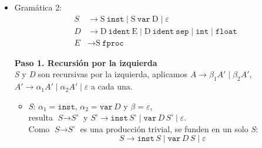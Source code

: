 \documentclass[12pt,letterpaper]{article}
\newcommand{\nt}[1]{\textit{#1}}
\newcommand{\tk}[1]{\texttt{#1}}
\newcommand{\tx}[1]{\text{#1}}
\newcommand{\First}[1]{\mathrm{FIRST}(#1)}
\newcommand{\Follow}[1]{\mathrm{FOLLOW}(#1)}
\newcommand{\eps}{\varepsilon}
\begin{document}
\begin{enumerate}[label=\arabic*.]
\begin{itemize}
    \nt{S} no tiene producción $\eps$, pero la producción 1 también aparece en \tk{fin} y \tk{\$} porque
    $\nt{T}\,\nt{R}\,\nt{V}\,\nt{S'}$ es anulable, por lo que se coloca además en $\Follow{\tx{S}}$.\\
   
    Ninguna celda tiene más de una producción.\\
    Para cada no terminal con alternativas se comprueba que sus \textsc{First} no se solapen y que, si una
    alternativa es $\eps$, los demás \textsc{First} sean disjuntos de su \textsc{Follow}:
    \begin{itemize}
    \item \nt{S'}: $\{\tk{inst}\}\cap\Follow{\tx{S'}}=\{\tk{inst}\}\cap\{\tk{fin},\tk{\$}\}=\varnothing$.
    \item \nt{T}: $\{\tk{tipo}\}\cap\Follow{\tx{T}}=\varnothing$.
    \item \nt{R}: $\{\tk{bloq}\}\cap\Follow{\tx{R}}=\varnothing$.
    \item \nt{V}: $\{\tk{id}\}\cap\Follow{\tx{V}}=\{\tk{id}\}\cap\{\tk{inst},\tk{fin},\tk{\$},\tk{fbloq}\}=\varnothing$.
    \item \nt{V'}: $\First{\tx{S}\,\tk{fin}}\cap\{\tk{;}\}=\{\tk{tipo},\tk{bloq},\tk{id},\tk{inst},\tk{fin}\}\cap\{\tk{;}\}=\varnothing$.
    \end{itemize}

    Por lo tanto, \textbf{la gramática transformada es LL(1)}.


    \newpage
    
    
  \item Gramática 2:
    \[
    \begin{aligned}
      \nt{S} &\to \tx{S}\ \tk{inst} \mid \tx{S}\ \tk{var}\ \tx{D} \mid \eps\\
      \nt{D} &\to \tx{D}\ \tk{ident}\ \tx{E} \mid \tx{D}\ \tk{ident}\ \tk{sep} \mid \tk{int} \mid \tk{float} \\
      \nt{E} &\to \tx{S}\ \tk{fproc} 
    \end{aligned}
    \]
    
    \bigskip

    \textbf{Paso 1. Recursión por la izquierda}\\
    \nt{S} y \nt{D} son recursivas por la izquierda, aplicamos $A\to\beta_1 A'\mid\beta_2 A'$,
    $A'\to\alpha_1 A'\mid\alpha_2 A'\mid\eps$ a cada una.
    \begin{itemize}
    \item \nt{S}: $\alpha_1=\tk{inst}$, $\alpha_2=\tk{var}\,\nt{D}$ y $\beta=\eps$,\\
      resulta $\nt{S}\to\nt{S'}$ y $\nt{S'}\to\tk{inst}\,\nt{S'}\mid\tk{var}\,\nt{D}\,\nt{S'}\mid\eps$.\\
      Como $\nt{S}\to\nt{S'}$ es una producción trivial, se funden en un solo \nt{S}:
      \[
      \nt{S}\to\tk{inst}\,\nt{S}\mid\tk{var}\,\nt{D}\,\nt{S}\mid\eps
      \]
      

\end{itemize}
\end{itemize}
\end{enumerate}
\end{document}
